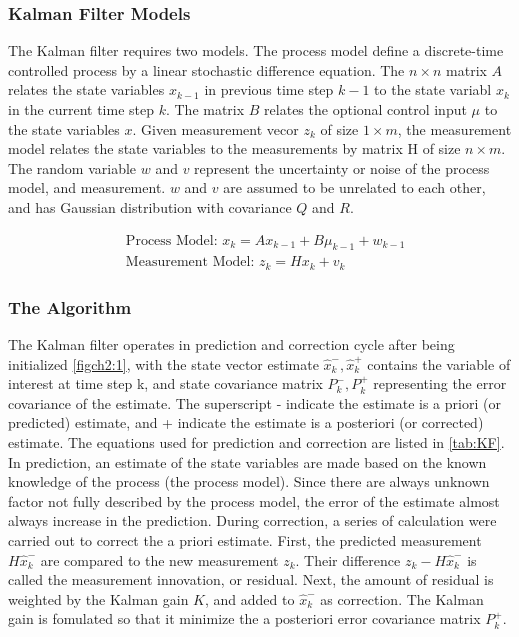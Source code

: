 \subsubsection{Kalman Filter Models}
The Kalman filter requires two models. The process model define a
discrete-time controlled process by a linear stochastic difference
equation. The $n\times n$ matrix $A$ relates the state variables
$x_{k-1}$ in previous time step $k-1$ to the state variabl $x_{k}$ in
the current time step $k$. The matrix $B$ relates the optional control
input $\mu$ to the state variables $x$. Given measurement vecor $z_k$
of size $1 \times m$, the measurement model relates the state
variables to the measurements by matrix H of size $n \times m$. The
random variable $w$ and $v$ represent the uncertainty or noise of the
process model, and measurement. $w$ and $v$ are assumed to be
unrelated to each other, and has Gaussian distribution with covariance
$Q$ and $R$. 

\begin{align}
&\text{Process Model: }x_k = Ax_{k-1}+B\mu_{k-1}+w_{k-1}\\
&\text{Measurement Model: }z_k = Hx_k+v_k
\end{align}

\subsubsection{The Algorithm}
The Kalman filter operates in prediction and correction cycle after
being initialized \ref{figch2:1}, with the state vector estimate
$\hat{x}^-_k, \hat{x}^+_k$ contains the variable of interest at time
step k, and state covariance matrix $P^-_k, P^+_k$ representing the
error covariance of the estimate. The superscript - indicate the
estimate is a priori (or predicted) estimate, and + indicate the
estimate is a posteriori (or corrected) estimate. The equations used
for prediction and correction are listed in \ref{tab:KF}. In
prediction, an estimate of the state variables are made based on the
known knowledge of the process (the process model). Since there are
always unknown factor not fully described by the process model, the
error of the estimate almost always increase in the prediction. During
correction, a series of calculation were carried out to correct the a
priori estimate. First, the predicted measurement $H\hat{x}^-_k$ are
compared to the new measurement $z_k$. Their difference $z_k -
H\hat{x}^-_k$ is called the measurement innovation, or residual. Next,
the amount of residual is weighted by the Kalman gain $K$, and added
to $\hat{x}^-_k$ as correction. The Kalman gain is fomulated so that
it minimize the a posteriori error covariance matrix $P^+_k$. 

